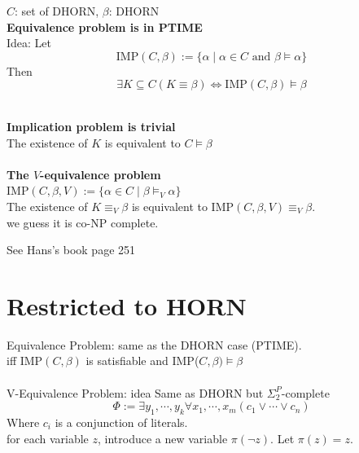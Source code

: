 \documentclass[12pt]{article}
\begin{document}
$C$: set of DHORN, $\beta$: DHORN \\

{\bf Equivalence problem is in PTIME}\\

Idea: Let $$\mbox{IMP}(C,\beta):=\{\alpha\mid \alpha\in C \mbox{ and }\beta\models \alpha\}$$
Then
$$\exists K\subseteq  C(K\equiv \beta)\Longleftrightarrow\mbox{IMP}(C,\beta)\models \beta$$


\ \\

{\bf Implication problem is trivial} \\ 

The existence of $K$ is equivalent to $C\models\beta$\\

\ \\


{\bf The $V$-equivalence problem}\\

IMP$(C,\beta,V):=\{\alpha\in C\mid \beta\models_V \alpha\}$\\

The existence of $K\equiv_V \beta$ is equivalent to IMP$(C,\beta, V)\equiv_V\beta$.\\

we guess it is co-NP complete.

See Hans's book page 251


\section{Restricted to HORN}


Equivalence Problem: same as the DHORN case (PTIME).\\

iff IMP$(C,\beta)$ is satisfiable and IMP($C,\beta)\models \beta$\\ 

\ \\

V-Equivalence Problem: idea Same as DHORN but $\Sigma_2^P$-complete\\ 


$$\Phi:=\exists y_1,\cdots, y_k \forall x_1,\cdots, x_m \left(c_1\vee\cdots\vee c_n \right)$$
%
Where $c_i$ is a conjunction of literals.\\

for each variable $z$, introduce a new variable $\pi(\neg z)$. Let $\pi(z)=z$.\\
\end{document}
